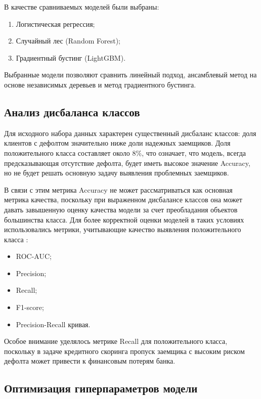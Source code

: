 В качестве сравниваемых моделей были выбраны:
\begin{enumerate}
    \item Логистическая регрессия;
    \item Случайный лес (Random Forest);
    \item Градиентный бустинг (LightGBM).
\end{enumerate}

Выбранные модели позволяют сравнить линейный подход, ансамблевый метод на основе независимых деревьев и метод градиентного бустинга.

\subsection{Анализ дисбаланса классов}

Для исходного набора данных характерен существенный дисбаланс классов: доля клиентов с дефолтом значительно ниже доли надежных заемщиков. Доля положительного класса составляет около 8\%, что означает, что модель, всегда предсказывающая отсутствие дефолта, будет иметь высокое значение Accuracy, но не будет решать основную задачу выявления проблемных заемщиков.

В связи с этим метрика Accuracy не может рассматриваться как основная метрика качества, поскольку при выраженном дисбалансе классов она может давать завышенную оценку качества модели за счет преобладания объектов большинства класса. Для более корректной оценки моделей в таких условиях использовались метрики, учитывающие качество выявления положительного класса \cite{DavisGoadrichPRROC}:

\begin{itemize}
    \item ROC-AUC;
    \item Precision;
    \item Recall;
    \item F1-score;
    \item Precision-Recall кривая.
\end{itemize}

Особое внимание уделялось метрике Recall для положительного класса, поскольку в задаче кредитного скоринга пропуск заемщика с высоким риском дефолта может привести к финансовым потерям банка.

\subsection{Оптимизация гиперпараметров модели}

